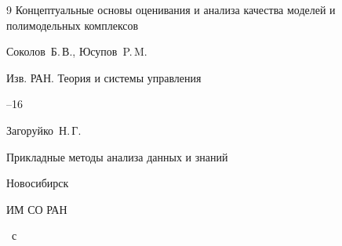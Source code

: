 \begin{thebibliography}{9}
\paper  Концептуальные основы оценивания и анализа качества моделей и полимодельных комплексов

\by Соколов~Б.\,В.,  Юсупов~P.\,M.

\jour Изв. РАН. Теория и системы управления



--16




\by Загоруйко~Н.\,Г.

\book Прикладные методы анализа данных и знаний

\publaddr  Новосибирск

\publ ИМ СО РАН


~с

\end{thebibliography}




\makeengtitlem

\lfoot[\thepage]{}

\rfoot[]{\thepage}



% 

